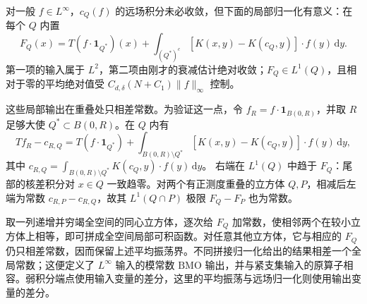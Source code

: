 对一般 \(f\in L^\infty\)，\(c_Q(f)\) 的远场积分未必收敛，但下面的局部归一化有意义：在每个 \(Q\) 内置
\[
 F_Q(x)=T(f\cdot\mathbf1_{Q^*})(x)
       +\int_{(Q^*)^c}[K(x,y)-K(c_Q,y)]\cdot f(y)\,\mathrm dy.
\]
第一项的输入属于 \(L^2\)，第二项由刚才的衰减估计绝对收敛；\(F_Q\in L^1(Q)\)，且相对于零的平均绝对值受 \(C_{d,\delta}(N+C_1)\|f\|_\infty\) 控制。

\ProseParagraphBreak

这些局部输出在重叠处只相差常数。为验证这一点，令 \(f_R=f\cdot\mathbf1_{B(0,R)}\)，并取 \(R\) 足够大使 \(Q^*\subset B(0,R)\)。在 \(Q\) 内有
\[
 Tf_R-c_{R,Q}=T(f\cdot\mathbf1_{Q^*})
  +\int_{B(0,R)\setminus Q^*}[K(x,y)-K(c_Q,y)]\cdot f(y)\,\mathrm dy,
\]
其中 \(c_{R,Q}=\int_{B(0,R)\setminus Q^*}K(c_Q,y)\cdot f(y)\,\mathrm dy\)。
右端在 \(L^1(Q)\) 中趋于 \(F_Q\)：尾部的核差积分对 \(x\in Q\) 一致趋零。对两个有正测度重叠的立方体 \(Q,P\)，相减后左端为常数 \(c_{R,P}-c_{R,Q}\)，故其 \(L^1(Q\cap P)\) 极限 \(F_Q-F_P\) 也为常数。

\ProseParagraphBreak

取一列递增并穷竭全空间的同心立方体，逐次给 \(F_Q\) 加常数，使相邻两个在较小立方体上相等，即可拼成全空间局部可积函数。对任意其他立方体，它与相应的 \(F_Q\) 仍只相差常数，因而保留上述平均振荡界。不同拼接归一化给出的结果相差一个全局常数；这便定义了 \(L^\infty\) 输入的模常数 \(\mathrm{BMO}\) 输出，并与紧支集输入的原算子相容。弱积分端点使用输入变量的差分，这里的平均振荡与远场归一化则使用输出变量的差分。
